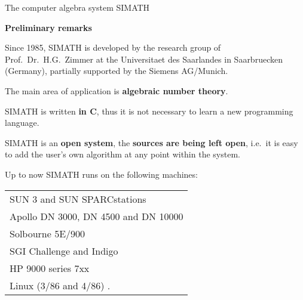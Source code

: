 \newcommand {\Strichq}{ \vrule height0.6em width0.1em depth0em \, }
\newcommand{ \Strichb}{ \vrule height0.68em width0.065em depth0em \, }
\newcommand {\Strichqc}{ \vrule height0.6em width0.065em depth-0.1em \, }
\newcommand {\Q}{{\rm{Q}}\hspace{-0.55em} \Strichq \ }
\newcommand {\Z}{{{\sf Z}\hspace{-1.3mm}{\sf Z}}}
\newcommand {\F}{{\rm{I\!F}}}
\newcommand {\R}{\hbox{${{{\Strichb}\hspace{-0.65mm}{\sf R}}}$}}
\newcommand {\C}{{\rm{C}}\hspace{-0.5em} \Strichqc \ }
\textwidth 5.8in
\oddsidemargin 0.5cm
\evensidemargin 0.5cm

\pagestyle{empty}

\noindent
{\huge
{\bf
\begin{center}The computer algebra system SIMATH\end{center}
}}
\vspace{1cm}
\begin{center}
{\Large {\bf Preliminary remarks}}
\end{center}

\vspace{0.4cm}
\noindent
Since 1985, SIMATH is developed by the research group of 
Prof.\ Dr.\ H.G.\ Zimmer at the Universitaet des Saarlandes in Saarbruecken
(Germany), partially supported by the Siemens AG/Munich.

\vspace{0.4cm}
\noindent
The main area of application is {\bf algebraic number theory}.

\vspace{0.4cm}
\noindent
SIMATH is written {\bf in C}, thus it is not necessary to learn a 
new programming language.

\vspace{0.4cm}
\noindent
SIMATH is an {\bf open system}, the {\bf sources are being left open}, 
i.e.\ it is easy to add the user's own algorithm at any point within the 
system.

\vspace{0.4cm}

\noindent
Up to now SIMATH runs on the following machines: 
\begin{center}
\begin{tabular}{l}
SUN 3 and SUN SPARCstations\\
Apollo DN 3000, DN 4500 and DN 10000 \\
Solbourne 5E/900 \\
SGI Challenge and Indigo \\
HP 9000 series 7xx \\
Linux (3/86 and 4/86) .
\end{tabular} 
\end{center}


